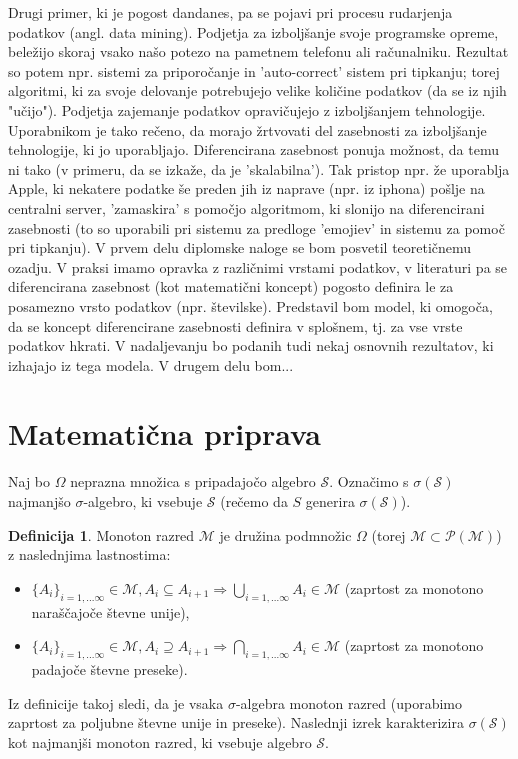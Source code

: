 \documentclass[12pt,a4paper]{amsart}
\theoremstyle{definition} %
\newtheorem{definicija}{Definicija}[section]
\theoremstyle{plain} %
\begin{document}
\newline
\newline
Drugi primer, ki je pogost dandanes, pa se pojavi pri procesu rudarjenja podatkov (angl. data mining). Podjetja za izboljšanje svoje programske opreme, beležijo skoraj vsako našo potezo na pametnem telefonu ali računalniku. Rezultat so potem npr. sistemi za priporočanje in 'auto-correct' sistem pri tipkanju; torej algoritmi, ki za svoje delovanje potrebujejo velike količine podatkov (da se iz njih "učijo"). Podjetja zajemanje podatkov opravičujejo z izboljšanjem tehnologije. Uporabnikom je tako rečeno, da morajo žrtvovati del zasebnosti za izboljšanje tehnologije, ki jo uporabljajo. Diferencirana zasebnost ponuja možnost, da temu ni tako (v primeru, da se izkaže, da je 'skalabilna'). Tak pristop npr. že uporablja Apple, ki nekatere podatke še preden jih iz naprave (npr. iz iphona) pošlje na centralni server, 'zamaskira' s pomočjo algoritmom, ki slonijo na diferencirani zasebnosti (to so uporabili pri sistemu za predloge 'emojiev' in sistemu za pomoč pri tipkanju). 
\newline
\newline
V prvem delu diplomske naloge se bom posvetil teoretičnemu ozadju. V praksi imamo opravka z različnimi vrstami podatkov, v literaturi pa se diferencirana zasebnost (kot matematični koncept) pogosto definira le za posamezno vrsto podatkov (npr. številske). Predstavil bom model, ki omogoča, da se koncept diferencirane zasebnosti definira v splošnem, tj. za vse vrste podatkov hkrati. V nadaljevanju bo podanih tudi nekaj osnovnih rezultatov, ki izhajajo iz tega modela. V drugem delu bom...

\section{Matematična priprava}

Naj bo $\Omega$ neprazna množica s pripadajočo algebro $\mathcal{S}$. Označimo s $\sigma(\mathcal{S})$ najmanjšo $\sigma$-algebro, ki vsebuje $\mathcal{S}$ (rečemo da $S$ generira $\sigma(\mathcal{S})$).
\begin{definicija}
Monoton razred $\mathcal{M}$ je družina podmnožic $\Omega$ (torej $\mathcal{M} \subset \mathcal{P(\mathcal{M})}$) z naslednjima lastnostima:
\begin{itemize}
\item  $\{A_i\}_{i=1,...\infty} \in \mathcal{M}, A_i \subseteq A_{i+1} \Rightarrow \bigcup_{i=1,...\infty} A_i \in \mathcal{M}$ (zaprtost za monotono naraščajoče števne unije),
\item  $\{A_i\}_{i=1,...\infty} \in \mathcal{M}, A_i \supseteq A_{i+1} \Rightarrow \bigcap_{i=1,...\infty} A_i \in \mathcal{M}$ (zaprtost za monotono padajoče števne preseke).
\end{itemize}
\end{definicija}
Iz definicije takoj sledi, da je vsaka $\sigma$-algebra monoton razred (uporabimo zaprtost za poljubne števne unije in preseke). Naslednji izrek karakterizira $\sigma(\mathcal{S})$ kot najmanjši monoton razred, ki vsebuje algebro $\mathcal{S}$.
\end{document}
